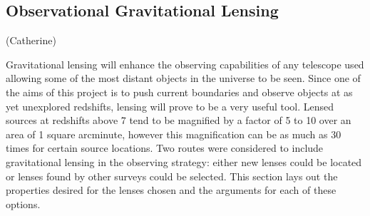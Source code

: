 
\subsection{Observational Gravitational Lensing} %
\label{sec:observational_gravitational_lensing}
(Catherine)

	Gravitational lensing will enhance the observing capabilities of any telescope used allowing some of the most distant objects in the universe to be seen. Since one of the aims of this project is to push current boundaries and observe objects at as yet unexplored redshifts, lensing will prove to be a very useful tool. Lensed sources at redshifts above 7 tend to be magnified by a factor of 5 to 10 over an area of 1 square arcminute, however this magnification can be as much as 30 times for certain source locations\cite{magnification}. Two routes were considered to include gravitational lensing in the observing strategy: either new lenses could be located or lenses found by other surveys could be selected. This section lays out the properties desired for the lenses chosen and the arguments for each of these options.

